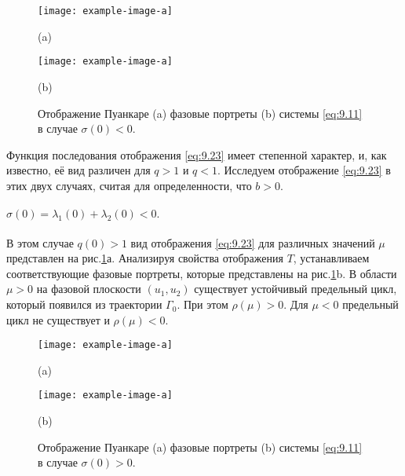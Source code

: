 \begin{figure}[h]
        \centering
        \begin{minipage}{\linewidth}
                \centering 
                \texttt{[image: example-image-a]}

                (a)
        \end{minipage}
        \begin{minipage}{\linewidth}
                \centering 
                \texttt{[image: example-image-a]}

                (b)
        \end{minipage}
        \caption{Отображение Пуанкаре (a)  фазовые портреты (b) системы  \eqref{eq:9.11} в случае
        $\sigma(0)<0.$}
        \label{fig:9.7}
\end{figure}
Функция последования отображения \eqref{eq:9.23} имеет степенной характер, и, как известно, её вид различен
для $q>1$ и $q<1$. Исследуем отображение \eqref{eq:9.23} в этих двух случаях, считая для определенности,
что $b>0.$
 
\paragraph{$\sigma(0) = \lambda_1(0) + \lambda_2(0) <0.$}%

В этом случае $q(0) >1$  вид отображения \eqref{eq:9.23} для различных значений $\mu$ представлен на рис.\ref{fig:9.7}а. Анализируя свойства отображения $T$, устанавливаем соответствующие фазовые портреты, которые представлены на рис.\ref{fig:9.7}b. В области $\mu>0$ на фазовой плоскости $(u_1,u_2)$ существует устойчивый предельный цикл, который появился из траектории $\Gamma_0.$ 
При этом $\rho(\mu) >0 .$ Для $\mu<0$ предельный цикл не существует и $\rho(\mu) <0.$
\begin{figure}[h]
        \centering
        \begin{minipage}{\linewidth}
                \centering 
                \texttt{[image: example-image-a]}

                (a)
        \end{minipage}
        \begin{minipage}{\linewidth}
                \centering 
                \texttt{[image: example-image-a]}

                (b)
        \end{minipage}
        \caption{Отображение Пуанкаре (a)  фазовые портреты (b) системы  \eqref{eq:9.11} в случае
        $\sigma(0)>0.$}
        \label{fig:9.8}
\end{figure}

